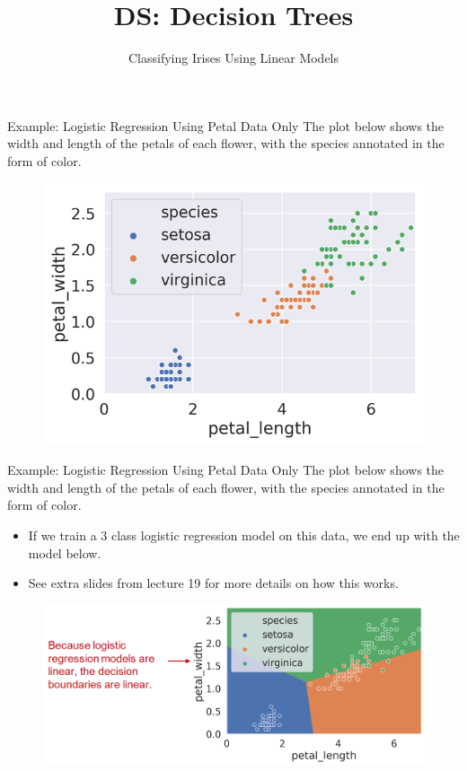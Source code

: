 \documentclass[aspectratio=169]{../latex_main/tntbeamer}  %
\title[Introduction]{DS: Decision Trees}
\subtitle{Classifying Irises Using Linear Models}
\begin{document}
	
	\maketitle
	\begin{frame}{Example: Logistic Regression Using Petal Data Only}
	    The plot below shows the width and length of the petals of each flower, with the species annotated in the form of color.
	    \begin{figure}
	        \centering
	        \includegraphics[scale=.75]{Bild3}
	    \end{figure}
	\end{frame}
	
	\begin{frame}{Example: Logistic Regression Using Petal Data Only}
	    The plot below shows the width and length of the petals of each flower, with the species annotated in the form of color.
	    \begin{itemize}
	        \item If we train a 3 class logistic regression model on this data, we end up with the model below.
	        \item See extra slides from lecture 19 for more details on how this works.
	    \end{itemize}
	    \begin{figure}
	        \centering
	        \includegraphics[scale=.4]{Bild4}
	    \end{figure}
	\end{frame}
\end{document}
